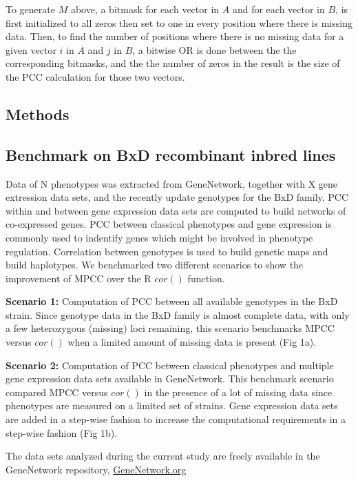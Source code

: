 \documentclass{bioinfo}
\begin{document}
To generate $M$ above, a bitmask for each vector in $A$ and for each vector in $B$, 
is first initialized to all zeros then set to one in every position where there is missing data.
Then, to find the number of positions where there is no missing data for a given vector $i$ 
in $A$ and $j$ in $B$, a bitwise OR is done between the the corresponding bitmasks, and the 
the number of zeros in the result is the size of the PCC calculation for those two vectors. \vspace*{-12pt}

\begin{methods}
\section{Methods}

\subsection{Benchmark on BxD recombinant inbred lines}
Data of N phenotypes was extracted from GeneNetwork, together with 
X gene extression data sets, and the recently update genotypes for 
the BxD family. PCC within and between gene expression data sets are 
computed to build networks of co-expressed genes. PCC between 
classical phenotypes and gene expression is commonly used to 
indentify genes which might be involved in phenotype regulation. 
Correlation between genotypes is used to build genetic maps and 
build haplotypes. We benchmarked two different scenarios to show 
the improvement of MPCC over the R $cor()$ function.

{\bf Scenario 1:} Computation of PCC between all available genotypes 
in the BxD strain. Since genotype data in the BxD family is almost 
complete data, with only a few heterozygous (missing) loci remaining, 
this scenario benchmarks MPCC versus $cor()$ when a limited amount of 
missing data is present (Fig 1a).

{\bf Scenario 2:} Computation of PCC between classical phenotypes and 
multiple gene expression data sets available in GeneNetwork. This 
benchmark scenario compared MPCC versus $cor()$ in the presence of 
a lot of missing data since phenotypes are measured on a limited set 
of strains. Gene expression data sets are added in a step-wise fashion 
to increase the computational requirements in a step-wise fashion 
(Fig 1b).

The data sets analyzed during the current study are freely available in the 
GeneNetwork repository, \href{https://genenetwork.org/}{GeneNetwork.org}

\end{methods}
\end{document}

